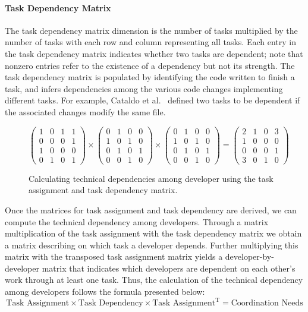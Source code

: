 \paragraph{Task Dependency Matrix}
The task dependency matrix dimension is the number of tasks multiplied by the number of tasks with each row and column representing all tasks.
Each entry in the task dependency matrix indicates whether two tasks are dependent; note that nonzero entries refer to the existence of a dependency but not its strength.
The task dependency matrix is populated by identifying the code written to finish a task, and infers dependencies among the various code changes implementing different tasks.
For example, Cataldo et al.~\cite{cataldo:cscw:2006} defined two tasks to be dependent if the associated changes modify the same file. 

\begin{figure}[t!]
\centering
\[
\left(
\begin{matrix}
1 & 0 & 1 & 1\\
0 & 0 & 0 & 1\\
1 & 0 & 0 & 0\\
0 & 1 & 0 & 1
\end{matrix}
\right)
\times
\left(
\begin{matrix}
0 & 1 & 0 & 0\\
1 & 0 & 1 & 0\\
0 & 1 & 0 & 1\\
0 & 0 & 1 & 0
\end{matrix}
\right)
\times
\left(
\begin{matrix}
0 & 1 & 0 & 0\\
1 & 0 & 1 & 0\\
0 & 1 & 0 & 1\\
0 & 0 & 1 & 0
\end{matrix}
\right)
=
\left(
\begin{matrix}
2 & 1 & 0 & 3\\
1 & 0 & 0 & 0\\
0 & 0 & 0 & 1\\
3 & 0 & 1 & 0
\end{matrix}
\right)
\]
\caption{Calculating technical dependencies among developer using the task assignment and task dependency matrix.}
\label{chap:3:fig:example:stc:cataldo}
\end{figure}
Once the matrices for task assignment and task dependency are derived, we can compute the technical dependency among developers.
Through a matrix multiplication of the task assignment with the task dependency matrix we obtain a matrix describing on which task a developer depends.
Further multiplying this matrix with the transposed task assignment matrix yields a developer-by-developer matrix that indicates which developers are dependent on each other's work through at least one task. 
%
Thus, the calculation of the technical dependency among developers follows the formula presented below:
\begin{equation}
\label{eq:stc:cataldo}
\text{Task Assignment} \times \text{Task Dependency} \times \text{Task Assignment}^{\text{T}} = \text{Coordination Needs}
\end{equation}

